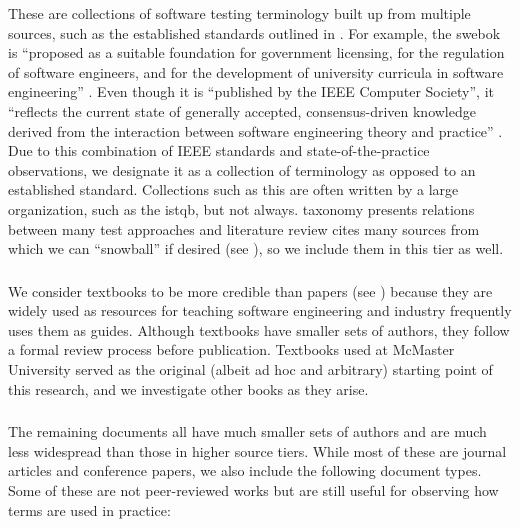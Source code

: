 These are collections of software testing terminology built up from multiple
sources, such as the established standards outlined in . For
example, the \acs{swebok} is ``proposed as a
suitable foundation for government licensing, for the regulation of software
engineers, and for the development of university curricula in software
engineering'' \citep[p.~xix]{KanerEtAl2011}. Even though it is ``published by
the IEEE Computer Society'', it ``reflects the current state of generally
accepted, consensus-driven knowledge derived from the interaction between
software engineering theory and practice'' \citep{AboutSWEBOK}. Due to this
combination of IEEE standards and state-of-the-practice observations, we
designate it as a collection of terminology as opposed to an established
standard. Collections such as this are often written by a large
organization, such as the \acf{istqb}, but not always. 
taxonomy presents relations between many test approaches and
 literature review cites many sources from which we can
``snowball'' if desired (see ), so we include them in this
tier as well.

\subsubsection{}\label{texts}

We consider textbooks to be more credible than papers (see )
because they are widely used as resources for teaching software engineering and
industry frequently uses them as guides. Although textbooks have smaller sets of
authors, they follow a formal review process before publication. Textbooks used
at McMaster University \citep{Patton2006,PetersAndPedrycz2000,vanVliet2000}
served as the original (albeit ad hoc and arbitrary) starting point of this
research, and we investigate other books as they arise. \addTextEx{}

\subsubsection{}\label{papers}

The remaining documents all have much smaller sets of authors and are much less
widespread than those in higher source tiers. While most of these are journal
articles and conference papers, we also include the following document types.
Some of these are not peer-reviewed works but are still useful for
observing how terms are used in practice:

